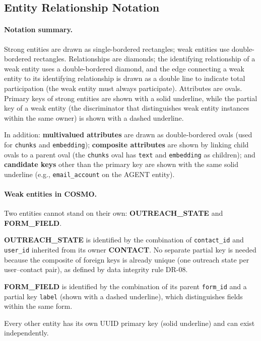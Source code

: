 \documentclass[a4paper]{article}
\begin{document}
\subsection{Entity Relationship Notation}
\label{appendix:erd-notation}

\paragraph{Notation summary.}
Strong entities are drawn as single-bordered rectangles; weak entities
use double-bordered rectangles. Relationships are diamonds; the
identifying relationship of a weak entity uses a double-bordered
diamond, and the edge connecting a weak entity to its identifying
relationship is drawn as a double line to indicate total participation
(the weak entity must always participate). Attributes are ovals.
Primary keys of strong entities are shown with a solid underline,
while the partial key of a weak entity (the discriminator that
distinguishes weak entity instances within the same owner) is shown
with a dashed underline.


In addition: \textbf{multivalued attributes} are drawn as
double-bordered ovals (used for \texttt{chunks} and \texttt{embedding});
\textbf{composite attributes} are shown by linking child ovals to a
parent oval (the \texttt{chunks} oval has \texttt{text} and
\texttt{embedding} as children); and \textbf{candidate keys} other
than the primary key are shown with the same solid underline (e.g.,
\texttt{email\_account} on the AGENT entity).

\paragraph{Weak entities in COSMO.}
Two entities cannot stand on their own:
\textbf{OUTREACH\_STATE} and \textbf{FORM\_FIELD}.

\textbf{OUTREACH\_STATE} is identified by the combination of
\texttt{contact\_id} and \texttt{user\_id} inherited from its owner
\textbf{CONTACT}. No separate partial key is needed because the
composite of foreign keys is already unique (one outreach state per
user--contact pair), as defined by data integrity rule DR-08.

\textbf{FORM\_FIELD} is identified by the combination of its parent
\texttt{form\_id} and a partial key \texttt{label} (shown with a dashed
underline), which distinguishes fields within the same form.

Every other entity has its own UUID primary key (solid underline) and
can exist independently.
\end{document}

